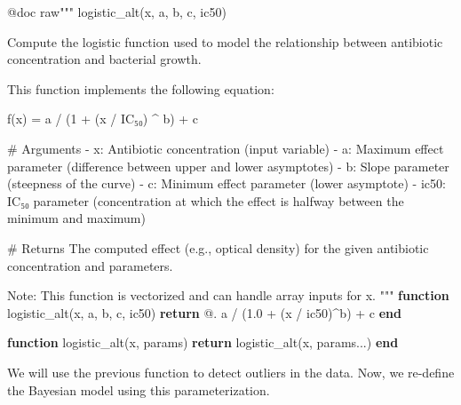 \documentclass[
]{scrartcl}
\newenvironment{Shaded}{\begin{snugshade}}{\end{snugshade}}
\newcommand{\ControlFlowTok}[1]{\textcolor[rgb]{0.00,0.23,0.31}{\textbf{#1}}}
\newcommand{\FloatTok}[1]{\textcolor[rgb]{0.68,0.00,0.00}{#1}}
\newcommand{\FunctionTok}[1]{\textcolor[rgb]{0.28,0.35,0.67}{#1}}
\newcommand{\KeywordTok}[1]{\textcolor[rgb]{0.00,0.23,0.31}{\textbf{#1}}}
\newcommand{\NormalTok}[1]{\textcolor[rgb]{0.00,0.23,0.31}{#1}}
\newcommand{\OperatorTok}[1]{\textcolor[rgb]{0.37,0.37,0.37}{#1}}
\newcommand{\PreprocessorTok}[1]{\textcolor[rgb]{0.68,0.00,0.00}{#1}}
\newcommand{\StringTok}[1]{\textcolor[rgb]{0.13,0.47,0.30}{#1}}
\begin{document}
\begin{Shaded}
\begin{Highlighting}[]
\PreprocessorTok{@doc} \StringTok{raw"""}
\StringTok{    logistic\_alt(x, a, b, c, ic50)}

\StringTok{Compute the logistic function used to model the relationship between antibiotic}
\StringTok{concentration and bacterial growth.}

\StringTok{This function implements the following equation:}

\StringTok{f(x) = a / (1 + (x / IC₅₀) \^{} b) + c}

\StringTok{\# Arguments}
\StringTok{{-} \textasciigrave{}x\textasciigrave{}: Antibiotic concentration (input variable)}
\StringTok{{-} \textasciigrave{}a\textasciigrave{}: Maximum effect parameter (difference between upper and lower asymptotes)}
\StringTok{{-} \textasciigrave{}b\textasciigrave{}: Slope parameter (steepness of the curve)}
\StringTok{{-} \textasciigrave{}c\textasciigrave{}: Minimum effect parameter (lower asymptote)}
\StringTok{{-} \textasciigrave{}ic50\textasciigrave{}: IC₅₀ parameter (concentration at which the effect is halfway between}
\StringTok{  the minimum and maximum)}

\StringTok{\# Returns}
\StringTok{The computed effect (e.g., optical density) for the given antibiotic}
\StringTok{concentration and parameters.}

\StringTok{Note: This function is vectorized and can handle array inputs for \textasciigrave{}x\textasciigrave{}.}
\StringTok{"""}
\KeywordTok{function} \FunctionTok{logistic\_alt}\NormalTok{(x, a, b, c, ic50)}
    \ControlFlowTok{return}\NormalTok{ @. a }\OperatorTok{/}\NormalTok{ (}\FloatTok{1.0} \OperatorTok{+}\NormalTok{ (x }\OperatorTok{/}\NormalTok{ ic50)}\OperatorTok{\^{}}\NormalTok{b) }\OperatorTok{+}\NormalTok{ c}
\KeywordTok{end}

\KeywordTok{function} \FunctionTok{logistic\_alt}\NormalTok{(x, params)}
    \ControlFlowTok{return} \FunctionTok{logistic\_alt}\NormalTok{(x, params}\OperatorTok{...}\NormalTok{)}
\KeywordTok{end}
\end{Highlighting}
\end{Shaded}

We will use the previous function to detect outliers in the data. Now,
we re-define the Bayesian model using this parameterization.
\end{document}
